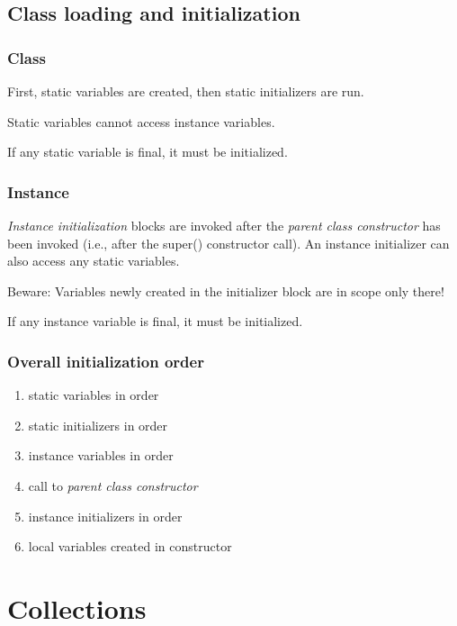 \documentclass{scrartcl}
\begin{document}
\subsection{Class loading and initialization}
\subsubsection{Class}

    First, static variables are created, then static initializers are run.

    Static variables cannot access instance variables.

    If any static variable is final, it must be initialized.

\subsubsection{Instance}

    \textit{Instance initialization} blocks are invoked after the \textit{parent class constructor} has been invoked (i.e., after the super() constructor call).
    An instance initializer can also access any static variables.

    Beware: Variables newly created in the initializer block are in scope only there!

    If any instance variable is final, it must be initialized.

\subsubsection{Overall initialization order}

    \begin{enumerate}
        \item static variables in order
        \item static initializers in order
        \item instance variables in order
        \item call to \textit{parent class constructor}
        \item instance initializers in order
        \item local variables created in constructor
    \end{enumerate}

\section{Collections}
\end{document}
